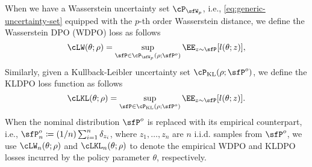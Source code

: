 When we have a Wasserstein uncertainty set $\cP_{\sfW_p}$, i.e., \cref{eq:generic-uncertainty-set} equipped with the $p$-th order Wasserstein distance, we define the Wasserstein DPO (WDPO) loss as follows
\begin{equation}\label{eq:wdpo-loss}
    \cLW(\theta;\rho) = \sup_{\sfP\in\cP_{\sfW_p}(\rho;\sfP^o)}\EE_{z\sim\sfP}[l(\theta; z)],
\end{equation}
Similarly, given a Kullback-Leibler uncertainty set $\cP_{\mathrm{KL}}(\rho;\sfP^o)$, we define the KLDPO loss function as follows
\begin{equation}\label{eq:kldpo-loss}
    \cLKL(\theta;\rho) = \sup_{\sfP\in\cP_{\mathrm{KL}}(\rho;\sfP^o)}\EE_{z\sim\sfP}[l(\theta; z)].
\end{equation}
When the nominal distribution $\sfP^o$ is replaced with its empirical counterpart, i.e., $\sfP^o_n\coloneqq(1/n)\sum_{i=1}^n\delta_{z_i}$, where $z_1,\dots,z_n$ are $n$ i.i.d. samples from $\sfP^o$, we use $\cLW_n(\theta;\rho)$ and $\cLKL_n(\theta;\rho)$ to denote the empirical WDPO and KLDPO losses incurred by the policy parameter $\theta$, respectively.


